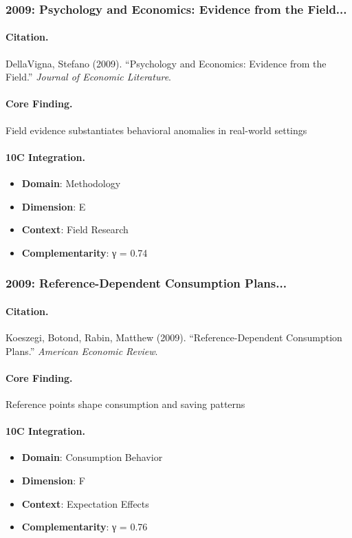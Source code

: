 \subsubsection{2009: Psychology and Economics: Evidence from the Field...}

\paragraph{Citation.}
DellaVigna, Stefano (2009). ``Psychology and Economics: Evidence from the Field.''
\textit{Journal of Economic Literature}.

\paragraph{Core Finding.}
Field evidence substantiates behavioral anomalies in real-world settings

\paragraph{10C Integration.}
\begin{itemize}[nosep]
  \item \textbf{Domain}: Methodology
  \item \textbf{Dimension}: E
  \item \textbf{Context}: Field Research
  \item \textbf{Complementarity}: γ = 0.74
\end{itemize}

\subsubsection{2009: Reference-Dependent Consumption Plans...}

\paragraph{Citation.}
Koeszegi, Botond, Rabin, Matthew (2009). ``Reference-Dependent Consumption Plans.''
\textit{American Economic Review}.

\paragraph{Core Finding.}
Reference points shape consumption and saving patterns

\paragraph{10C Integration.}
\begin{itemize}[nosep]
  \item \textbf{Domain}: Consumption Behavior
  \item \textbf{Dimension}: F
  \item \textbf{Context}: Expectation Effects
  \item \textbf{Complementarity}: γ = 0.76
\end{itemize}

